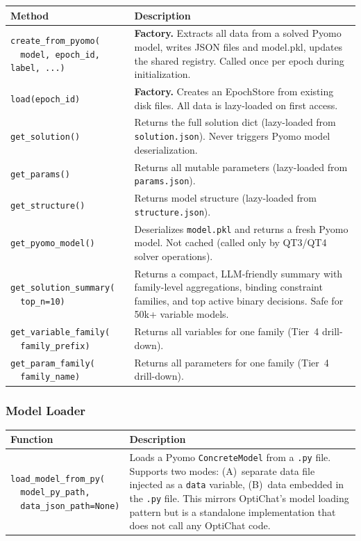\documentclass[11pt, a4paper]{article}
\begin{document}
\begin{longtable}{p{5.5cm} p{9cm}}
\toprule
\textbf{Method} & \textbf{Description} \\
\midrule
\texttt{create\_from\_pyomo(\\ ~~model, epoch\_id, label, ...)} &
    \textbf{Factory.}  Extracts all data from a solved Pyomo model,
    writes JSON files and model.pkl, updates the shared registry.
    Called once per epoch during initialization. \\
\midrule
\texttt{load(epoch\_id)} &
    \textbf{Factory.}  Creates an EpochStore from existing disk files.
    All data is lazy-loaded on first access. \\
\midrule
\texttt{get\_solution()} &
    Returns the full solution dict (lazy-loaded from \texttt{solution.json}).
    Never triggers Pyomo model deserialization. \\
\midrule
\texttt{get\_params()} &
    Returns all mutable parameters (lazy-loaded from \texttt{params.json}). \\
\midrule
\texttt{get\_structure()} &
    Returns model structure (lazy-loaded from \texttt{structure.json}). \\
\midrule
\texttt{get\_pyomo\_model()} &
    Deserializes \texttt{model.pkl} and returns a fresh Pyomo model.
    Not cached (called only by QT3/QT4 solver operations). \\
\midrule
\texttt{get\_solution\_summary(\\ ~~top\_n=10)} &
    Returns a compact, LLM-friendly summary with family-level
    aggregations, binding constraint families, and top active binary
    decisions.  Safe for 50k+ variable models. \\
\midrule
\texttt{get\_variable\_family(\\ ~~family\_prefix)} &
    Returns all variables for one family (Tier~4 drill-down). \\
\midrule
\texttt{get\_param\_family(\\ ~~family\_name)} &
    Returns all parameters for one family (Tier~4 drill-down). \\
\bottomrule
\end{longtable}

\subsubsection{Model Loader}

\begin{longtable}{p{5.5cm} p{9cm}}
\toprule
\textbf{Function} & \textbf{Description} \\
\midrule
\texttt{load\_model\_from\_py(\\ ~~model\_py\_path,\\ ~~data\_json\_path=None)} &
    Loads a Pyomo \texttt{ConcreteModel} from a \texttt{.py} file.
    Supports two modes: (A)~separate data file injected as a
    \texttt{data} variable, (B)~data embedded in the \texttt{.py} file.
    This mirrors OptiChat's model loading pattern but is a standalone
    implementation that does not call any OptiChat code. \\
\bottomrule
\end{longtable}
\end{document}
